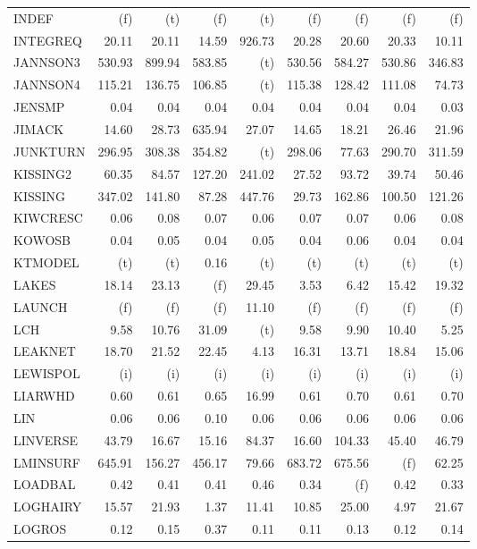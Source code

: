 \documentclass[11pt,twoside]{article}
\begin{document}
{\begin{longtable}[c]{|l|r|r|r|r|r|r|r|r|}
INDEF & (f) & (t) & (f) & (t) & (f) & (f) & (f) & (f) \\
INTEGREQ & 20.11 & 20.11 & 14.59 & 926.73 & 20.28 & 20.60 & 20.33 & 10.11 \\
JANNSON3 & 530.93 & 899.94 & 583.85 & (t) & 530.56 & 584.27 & 530.86 & 346.83 \\
JANNSON4 & 115.21 & 136.75 & 106.85 & (t) & 115.38 & 128.42 & 111.08 & 74.73 \\
JENSMP & 0.04 & 0.04 & 0.04 & 0.04 & 0.04 & 0.04 & 0.04 & 0.03 \\
JIMACK & 14.60 & 28.73 & 635.94 & 27.07 & 14.65 & 18.21 & 26.46 & 21.96 \\
JUNKTURN & 296.95 & 308.38 & 354.82 & (t) & 298.06 & 77.63 & 290.70 & 311.59 \\
KISSING2 & 60.35 & 84.57 & 127.20 & 241.02 & 27.52 & 93.72 & 39.74 & 50.46 \\
KISSING & 347.02 & 141.80 & 87.28 & 447.76 & 29.73 & 162.86 & 100.50 & 121.26 \\
KIWCRESC & 0.06 & 0.08 & 0.07 & 0.06 & 0.07 & 0.07 & 0.06 & 0.08 \\
KOWOSB & 0.04 & 0.05 & 0.04 & 0.05 & 0.04 & 0.06 & 0.04 & 0.04 \\
KTMODEL & (t) & (t) & 0.16 & (t) & (t) & (t) & (t) & (t) \\
LAKES & 18.14 & 23.13 & (f) & 29.45 & 3.53 & 6.42 & 15.42 & 19.32 \\
LAUNCH & (f) & (f) & (f) & 11.10 & (f) & (f) & (f) & (f) \\
LCH & 9.58 & 10.76 & 31.09 & (t) & 9.58 & 9.90 & 10.40 & 5.25 \\
LEAKNET & 18.70 & 21.52 & 22.45 & 4.13 & 16.31 & 13.71 & 18.84 & 15.06 \\
LEWISPOL & (i) & (i) & (i) & (i) & (i) & (i) & (i) & (i) \\
LIARWHD & 0.60 & 0.61 & 0.65 & 16.99 & 0.61 & 0.70 & 0.61 & 0.70 \\
LIN & 0.06 & 0.06 & 0.10 & 0.06 & 0.06 & 0.06 & 0.06 & 0.06 \\
LINVERSE & 43.79 & 16.67 & 15.16 & 84.37 & 16.60 & 104.33 & 45.40 & 46.79 \\
LMINSURF & 645.91 & 156.27 & 456.17 & 79.66 & 683.72 & 675.56 & (f) & 62.25 \\
LOADBAL & 0.42 & 0.41 & 0.41 & 0.46 & 0.34 & (f) & 0.42 & 0.33 \\
LOGHAIRY & 15.57 & 21.93 & 1.37 & 11.41 & 10.85 & 25.00 & 4.97 & 21.67 \\
LOGROS & 0.12 & 0.15 & 0.37 & 0.11 & 0.11 & 0.13 & 0.12 & 0.14 \\

\end{longtable}}
\end{document}
